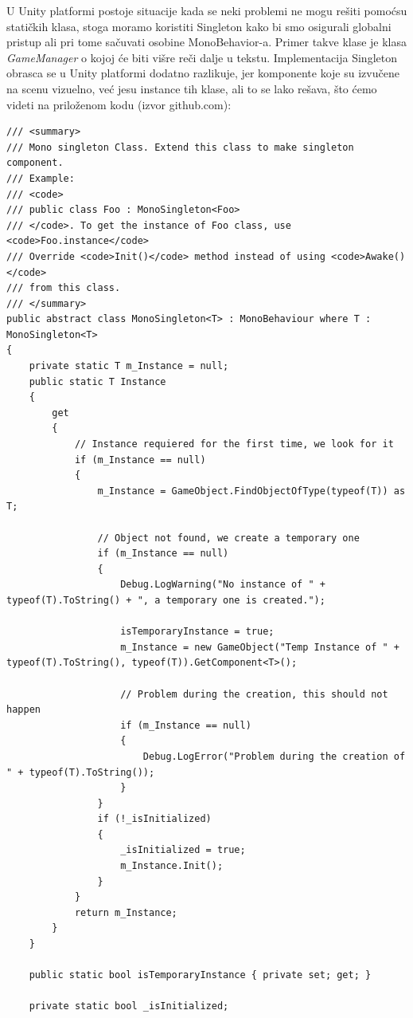 U Unity platformi postoje situacije kada se neki problemi ne mogu re\v{s}iti pomo\'csu stati\v{c}kih klasa, 
stoga moramo koristiti Singleton kako bi smo osigurali globalni pristup ali pri tome sa\v{c}uvati osobine MonoBehavior-a. 
Primer takve klase je klasa \emph{GameManager} o kojoj \'ce biti vi\v{s}re re\v{c}i dalje u tekstu. Implementacija Singleton obrasca se 
u Unity platformi dodatno razlikuje, jer komponente koje su izvu\v{c}ene na scenu vizuelno, ve\'c jesu instance tih klase, ali to se lako re\v{s}ava,
\v{s}to \'cemo videti na prilo\v{z}enom kodu (izvor github.com):

\begin{verbatim}
/// <summary>
/// Mono singleton Class. Extend this class to make singleton component.
/// Example: 
/// <code>
/// public class Foo : MonoSingleton<Foo>
/// </code>. To get the instance of Foo class, use <code>Foo.instance</code>
/// Override <code>Init()</code> method instead of using <code>Awake()</code>
/// from this class.
/// </summary>
public abstract class MonoSingleton<T> : MonoBehaviour where T : MonoSingleton<T>
{
    private static T m_Instance = null;
    public static T Instance
    {
        get
        {
            // Instance requiered for the first time, we look for it
            if (m_Instance == null)
            {
                m_Instance = GameObject.FindObjectOfType(typeof(T)) as T;

                // Object not found, we create a temporary one
                if (m_Instance == null)
                {
                    Debug.LogWarning("No instance of " + typeof(T).ToString() + ", a temporary one is created.");

                    isTemporaryInstance = true;
                    m_Instance = new GameObject("Temp Instance of " + typeof(T).ToString(), typeof(T)).GetComponent<T>();

                    // Problem during the creation, this should not happen
                    if (m_Instance == null)
                    {
                        Debug.LogError("Problem during the creation of " + typeof(T).ToString());
                    }
                }
                if (!_isInitialized)
                {
                    _isInitialized = true;
                    m_Instance.Init();
                }
            }
            return m_Instance;
        }
    }

    public static bool isTemporaryInstance { private set; get; }

    private static bool _isInitialized;


\end{verbatim}
